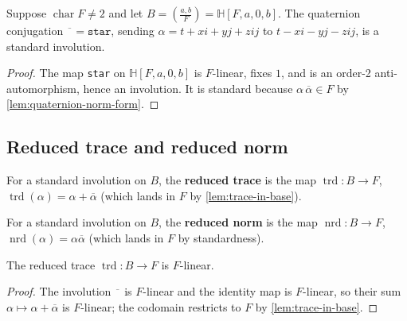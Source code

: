 \begin{lemma}
    \label{lem:quaternion-standard-involution}
    Suppose $\operatorname{char} F \neq 2$ and let
    $B = \left(\frac{a,b}{F}\right) = \mathbb{H}[F,a,0,b]$. The quaternion
    conjugation $\overline{\phantom{a}} = \texttt{star}$, sending
    $\alpha = t + xi + yj + zij$ to $t - xi - yj - zij$, is a standard involution.
\end{lemma}
\begin{proof}
    The map \texttt{star} on $\mathbb{H}[F,a,0,b]$ is $F$-linear, fixes $1$, and is
    an order-2 anti-automorphism, hence an involution. It is standard because
    $\alpha\,\overline\alpha \in F$ by \ref{lem:quaternion-norm-form}.
\end{proof}

\subsection{Reduced trace and reduced norm}

\begin{definition}
    \label{def:reduced-trace}
    For a standard involution on $B$, the \textbf{reduced trace} is the map
    $\operatorname{trd} \colon B \to F$, $\operatorname{trd}(\alpha) =
    \alpha + \overline{\alpha}$ (which lands in $F$ by \ref{lem:trace-in-base}).
\end{definition}

\begin{definition}
    \label{def:reduced-norm}
    For a standard involution on $B$, the \textbf{reduced norm} is the map
    $\operatorname{nrd} \colon B \to F$, $\operatorname{nrd}(\alpha) =
    \alpha\overline{\alpha}$ (which lands in $F$ by standardness).
\end{definition}

\begin{lemma}
    \label{lem:trace-linear}
    The reduced trace $\operatorname{trd} \colon B \to F$ is $F$-linear.
\end{lemma}
\begin{proof}
    The involution $\overline{\phantom{a}}$ is $F$-linear and the identity map is
    $F$-linear, so their sum $\alpha \mapsto \alpha + \overline{\alpha}$ is
    $F$-linear; the codomain restricts to $F$ by \ref{lem:trace-in-base}.
\end{proof}

